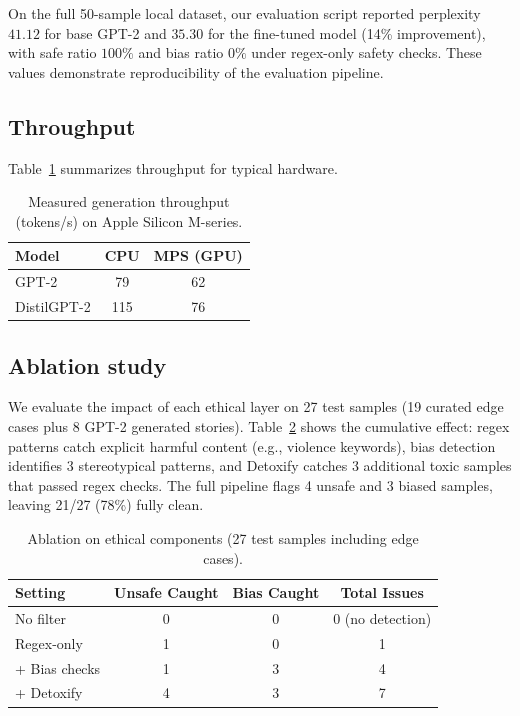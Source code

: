 \documentclass[conference]{IEEEtran}
\begin{document}
On the full 50-sample local dataset, our evaluation script reported perplexity \(41.12\) for base GPT-2 and \(35.30\) for the fine-tuned model (14\% improvement), with safe ratio \(100\%\) and bias ratio \(0\%\) under regex-only safety checks. These values demonstrate reproducibility of the evaluation pipeline.

\subsection{Throughput}
Table~\ref{tab:throughput} summarizes throughput for typical hardware.

\begin{table}[t]
    \centering
    \caption{Measured generation throughput (tokens/s) on Apple Silicon M-series.}
    \label{tab:throughput}
    \begin{tabular}{lcc}
        \toprule
        Model & CPU & MPS (GPU) \\
        \midrule
        GPT-2 & 79 & 62 \\
        DistilGPT-2 & 115 & 76 \\
        \bottomrule
    \end{tabular}
\end{table}

\subsection{Ablation study}
We evaluate the impact of each ethical layer on 27 test samples (19 curated edge cases plus 8 GPT-2 generated stories). Table~\ref{tab:ablation} shows the cumulative effect: regex patterns catch explicit harmful content (e.g., violence keywords), bias detection identifies 3 stereotypical patterns, and Detoxify catches 3 additional toxic samples that passed regex checks. The full pipeline flags 4 unsafe and 3 biased samples, leaving 21/27 (78\%) fully clean.

\begin{table}[t]
    \centering
    \caption{Ablation on ethical components (27 test samples including edge cases).}
    \label{tab:ablation}
    \begin{tabular}{lccc}
        \toprule
        Setting & Unsafe Caught & Bias Caught & Total Issues \\
        \midrule
        No filter & 0 & 0 & 0 (no detection) \\
        Regex-only & 1 & 0 & 1 \\
        + Bias checks & 1 & 3 & 4 \\
        + Detoxify & 4 & 3 & 7 \\
        \bottomrule
    \end{tabular}
\end{table}
\end{document}
